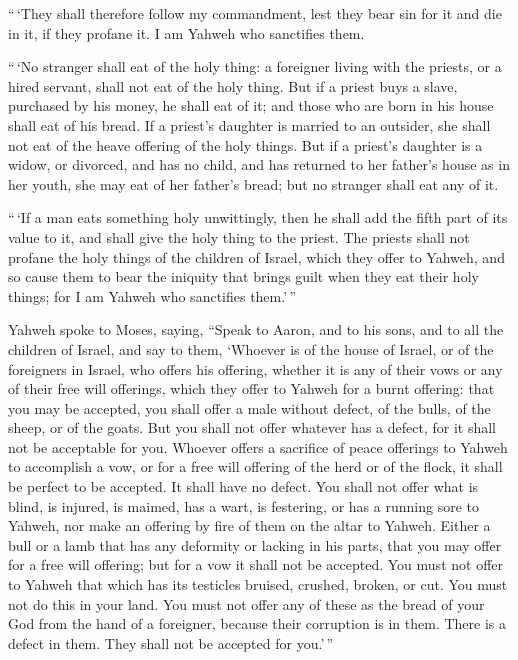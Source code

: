  ``\,`They shall therefore follow my commandment, lest they
bear sin for it and die in it, if they profane it. I am Yahweh who
sanctifies them.

 ``\,`No stranger shall eat of the holy thing: a foreigner
living with the priests, or a hired servant, shall not eat of the holy
thing.  But if a priest buys a slave, purchased by his
money, he shall eat of it; and those who are born in his house shall eat
of his bread.  If a priest's daughter is married to an
outsider, she shall not eat of the heave offering of the holy things.
 But if a priest's daughter is a widow, or divorced, and
has no child, and has returned to her father's house as in her youth,
she may eat of her father's bread; but no stranger shall eat any of it.

 ``\,`If a man eats something holy unwittingly, then he
shall add the fifth part of its value to it, and shall give the holy
thing to the priest.  The priests shall not profane the
holy things of the children of Israel, which they offer to Yahweh,
 and so cause them to bear the iniquity that brings guilt
when they eat their holy things; for I am Yahweh who sanctifies
them.'\,''

 Yahweh spoke to Moses, saying,  ``Speak to
Aaron, and to his sons, and to all the children of Israel, and say to
them, `Whoever is of the house of Israel, or of the foreigners in
Israel, who offers his offering, whether it is any of their vows or any
of their free will offerings, which they offer to Yahweh for a burnt
offering:  that you may be accepted, you shall offer a male
without defect, of the bulls, of the sheep, or of the goats.
 But you shall not offer whatever has a defect, for it
shall not be acceptable for you.  Whoever offers a
sacrifice of peace offerings to Yahweh to accomplish a vow, or for a
free will offering of the herd or of the flock, it shall be perfect to
be accepted. It shall have no defect.  You shall not offer
what is blind, is injured, is maimed, has a wart, is festering, or has a
running sore to Yahweh, nor make an offering by fire of them on the
altar to Yahweh.  Either a bull or a lamb that has any
deformity or lacking in his parts, that you may offer for a free will
offering; but for a vow it shall not be accepted.  You must
not offer to Yahweh that which has its testicles bruised, crushed,
broken, or cut. You must not do this in your land.  You
must not offer any of these as the bread of your God from the hand of a
foreigner, because their corruption is in them. There is a defect in
them. They shall not be accepted for you.'\,''

